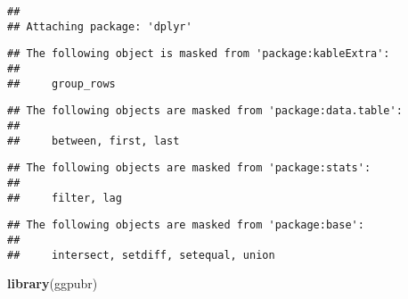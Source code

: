 \documentclass[
]{article}
\newenvironment{Shaded}{\begin{snugshade}}{\end{snugshade}}
\newcommand{\FunctionTok}[1]{\textcolor[rgb]{0.13,0.29,0.53}{\textbf{#1}}}
\newcommand{\NormalTok}[1]{#1}
\begin{document}
\begin{verbatim}
## 
## Attaching package: 'dplyr'
\end{verbatim}

\begin{verbatim}
## The following object is masked from 'package:kableExtra':
## 
##     group_rows
\end{verbatim}

\begin{verbatim}
## The following objects are masked from 'package:data.table':
## 
##     between, first, last
\end{verbatim}

\begin{verbatim}
## The following objects are masked from 'package:stats':
## 
##     filter, lag
\end{verbatim}

\begin{verbatim}
## The following objects are masked from 'package:base':
## 
##     intersect, setdiff, setequal, union
\end{verbatim}

\begin{Shaded}
\begin{Highlighting}[]
\FunctionTok{library}\NormalTok{(ggpubr)}
\end{Highlighting}
\end{Shaded}
\end{document}
